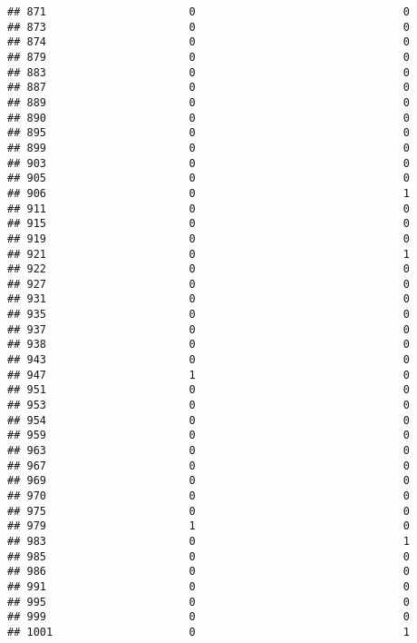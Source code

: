 \documentclass[
]{article}
\begin{document}
\begin{verbatim}
## 871                      0                                0
## 873                      0                                0
## 874                      0                                0
## 879                      0                                0
## 883                      0                                0
## 887                      0                                0
## 889                      0                                0
## 890                      0                                0
## 895                      0                                0
## 899                      0                                0
## 903                      0                                0
## 905                      0                                0
## 906                      0                                1
## 911                      0                                0
## 915                      0                                0
## 919                      0                                0
## 921                      0                                1
## 922                      0                                0
## 927                      0                                0
## 931                      0                                0
## 935                      0                                0
## 937                      0                                0
## 938                      0                                0
## 943                      0                                0
## 947                      1                                0
## 951                      0                                0
## 953                      0                                0
## 954                      0                                0
## 959                      0                                0
## 963                      0                                0
## 967                      0                                0
## 969                      0                                0
## 970                      0                                0
## 975                      0                                0
## 979                      1                                0
## 983                      0                                1
## 985                      0                                0
## 986                      0                                0
## 991                      0                                0
## 995                      0                                0
## 999                      0                                0
## 1001                     0                                1

\end{verbatim}
\end{document}
